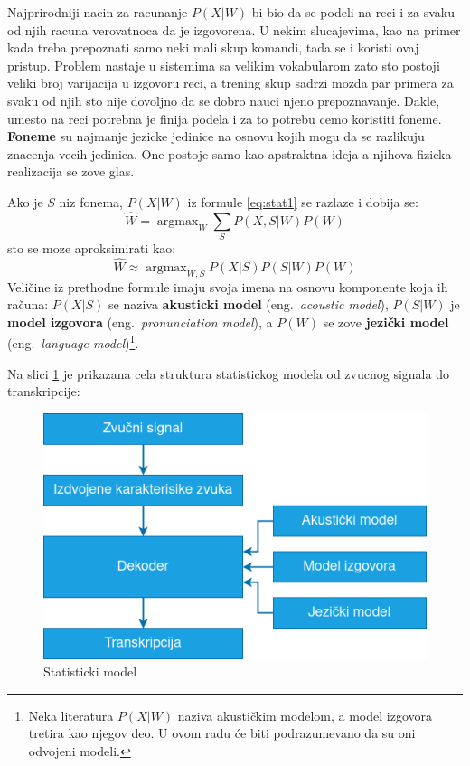 \documentclass[a4paper]{article}
\DeclareMathOperator*{\argmax}{argmax}
\begin{document}
Najprirodniji nacin za racunanje $P(X|W)$ bi bio da se podeli na reci i za svaku od njih racuna verovatnoca da je izgovorena.
U nekim slucajevima, kao na primer kada treba prepoznati samo neki mali skup komandi, tada se i koristi ovaj pristup.
Problem nastaje u sistemima sa velikim vokabularom zato sto postoji veliki broj varijacija u izgovoru reci, a trening skup sadrzi mozda par primera za svaku od njih sto nije dovoljno da se dobro nauci njeno prepoznavanje.
Dakle, umesto na reci potrebna je finija podela i za to potrebu cemo koristiti foneme.
\textbf{Foneme} su najmanje jezicke jedinice na osnovu kojih mogu da se razlikuju znacenja vecih jedinica.
One postoje samo kao apstraktna ideja a njihova fizicka realizacija se zove glas.

Ako je $S$ niz fonema, $P(X|W)$ iz formule \ref{eq:stat1} se razlaze i dobija se:
\begin{equation*}
  \hat{W} = \argmax_{W} \sum_{S} P(X,S|W) P(W)
\end{equation*}
sto se moze aproksimirati kao:
\begin{equation}
  \label{eq:stat2}
  \hat{W} \approx \argmax_{W,S} P(X|S) P(S|W) P(W)
\end{equation}
Veličine iz prethodne formule imaju svoja imena na osnovu komponente koja ih računa:
$P(X|S)$ se naziva \textbf{akusticki model} (eng.~{\em acoustic model}), 
$P(S|W)$ je \textbf{model izgovora} (eng.~{\em pronunciation model}),
a $P(W)$ se zove \textbf{jezički model} (eng.~{\em language model})\footnote{Neka literatura $P(X|W)$ naziva akustičkim modelom, a model izgovora tretira kao njegov deo. U ovom radu će biti podrazumevano da su oni odvojeni modeli.}.

Na slici \ref{fig:statistical_model} je prikazana cela struktura statistickog modela od zvucnog signala do transkripcije:
\begin{figure}[h!]
  \begin{center}
    \includegraphics[scale=0.5]{statistical_model.png}
  \end{center}
  \caption{Statisticki model}
  \label{fig:statistical_model}
\end{figure}
\end{document}
